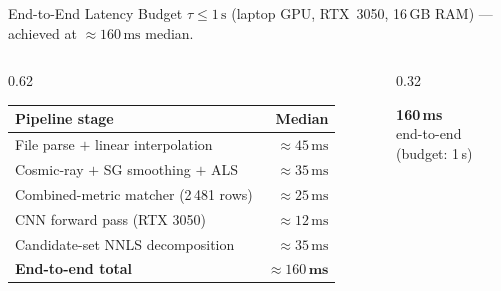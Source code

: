 \documentclass[aspectratio=169,10pt]{beamer}
\begin{document}
\begin{frame}{End-to-End Latency}
  Budget $\tau\le1\,\text{s}$ (laptop GPU, RTX~3050, 16\,GB RAM)
  --- achieved at $\approx160\,\text{ms}$ median.

  \vspace{0.20cm}
  \begin{columns}[c]
    \begin{column}{0.62\textwidth}
      \footnotesize
      \begin{tabular}{@{}lr@{}}
        \toprule
        \textbf{Pipeline stage} & \textbf{Median}\\
        \midrule
        File parse $+$ linear interpolation
          & $\approx45\,\text{ms}$\\
        Cosmic-ray $+$ SG smoothing $+$ ALS
          & $\approx35\,\text{ms}$\\
        Combined-metric matcher (2\,481 rows)
          & $\approx25\,\text{ms}$\\
        CNN forward pass (RTX 3050)
          & $\approx12\,\text{ms}$\\
        Candidate-set NNLS decomposition
          & $\approx35\,\text{ms}$\\
        \midrule
        \textbf{End-to-end total}
          & $\bm{\approx}160\,\mathbf{ms}$\\
        \bottomrule
      \end{tabular}
    \end{column}
    \begin{column}{0.32\textwidth}
      \begin{block}{}
        \centering
        {\huge\bfseries 160\,ms}\\[3pt]
        {\footnotesize end-to-end}\\[1pt]
        {\footnotesize (budget: 1\,s)}
      \end{block}
    \end{column}
  \end{columns}
\end{frame}
\end{document}
